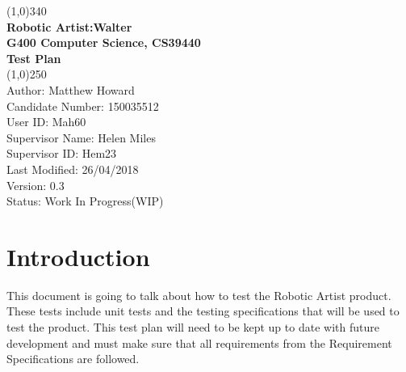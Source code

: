 \documentclass{article}
\begin{document}

    \begin{titlepage}

        \begin{center}

        \line(1,0){340}\\ 


        \large{\bfseries Robotic Artist:Walter} \\

        \large {\bfseries G400 Computer Science, CS39440 }\\
        
        \large {\bfseries Test Plan}\\


         \line(1,0){250}\\

         \textsf {Author: Matthew Howard \\
          Candidate Number: 150035512\\
          User ID: Mah60 \\
          Supervisor Name: Helen Miles \\
          Supervisor ID: Hem23\\
          Last Modified: 26/04/2018 \\
          Version: 0.3\\
          Status: Work In Progress(WIP)} \\

        \end{center}        

    \end{titlepage}
  
    \clearpage

     \tableofcontents
     
     \clearpage

    \section{Introduction}
This document is going to talk about how to test the Robotic Artist product. These tests include unit tests and the testing specifications that will be used to test the product. This test plan will need to be kept up to date with future development and must make sure that all requirements from the Requirement Specifications are followed.\cite{Requirement_specifications}\\ \newline
\end{document}
